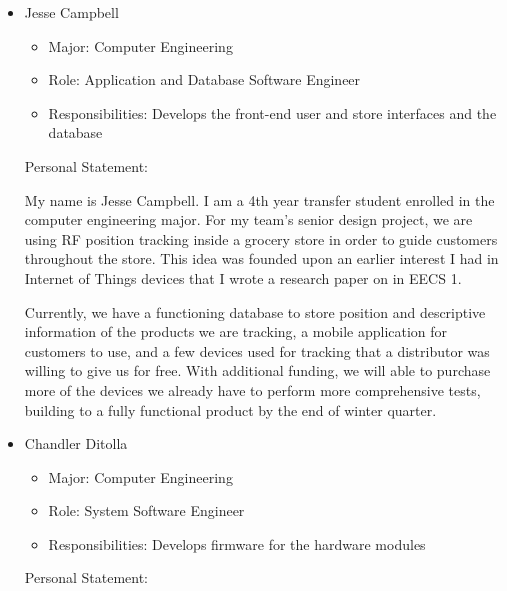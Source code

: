 \documentclass{article}
\begin{document}
\begin{itemize}
\item Jesse Campbell
	\begin{itemize}
	\item Major: Computer Engineering
	\item Role: Application and Database Software Engineer
	\item Responsibilities: Develops the front-end user and store interfaces and the database
	\end{itemize}
Personal Statement:

My name is Jesse Campbell. I am a 4th year transfer student enrolled in the computer engineering major. For my team’s senior design project, we are using RF position tracking inside a grocery store in order to guide customers throughout the store. This idea was founded upon an earlier interest I had in Internet of Things devices that I wrote a research paper on in EECS 1. 

Currently, we have a functioning database to store position and descriptive information of the products we are tracking, a mobile application for customers to use, and a few devices used for tracking that a distributor was willing to give us for free. With additional funding, we will able to purchase more of the devices we already have to perform more comprehensive tests, building to a fully functional product by the end of winter quarter.
\item Chandler Ditolla
	\begin{itemize}
	\item Major: Computer Engineering
	\item Role: System Software Engineer
	\item Responsibilities: Develops firmware for the hardware modules
	\end{itemize}
Personal Statement:


\end{itemize}
\end{document}
